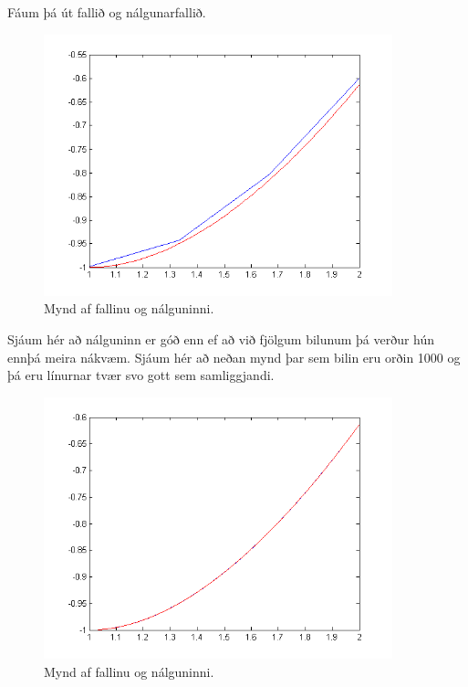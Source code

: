 \documentclass[11pt,a4paper,titlepage]{article}
\begin{document}
 Fáum þá út fallið og nálgunarfallið. 
 
  \begin{figure}[h!]
      \centering
      \includegraphics[width=0.9\textwidth]{nalgun1_4.png}
      \caption{Mynd af fallinu og nálguninni.}
      \label{fig:awesome_image1}
  \end{figure}
  
  Sjáum hér að nálguninn er góð enn ef að við fjölgum bilunum þá verður hún ennþá meira nákvæm.  Sjáum hér að neðan mynd þar sem bilin eru orðin 1000 og þá eru línurnar tvær svo gott sem samliggjandi. 
  
   \begin{figure}[h!]
        \centering
        \includegraphics[width=0.9\textwidth]{nalgun2_4.png}
        \caption{Mynd af fallinu og nálguninni.}
        \label{fig:awesome_image2}
    \end{figure}
\end{document}
